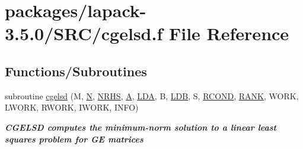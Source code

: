 \hypertarget{cgelsd_8f}{}\section{packages/lapack-\/3.5.0/\+S\+R\+C/cgelsd.f File Reference}
\label{cgelsd_8f}
\subsection*{Functions/\+Subroutines}
\begin{DoxyCompactItemize}
\item 
subroutine \hyperlink{group__complexGEsolve_gabe955d518aa1f5fec04eb13fb9ee56c2}{cgelsd} (M, \hyperlink{polmisc_8c_a0240ac851181b84ac374872dc5434ee4}{N}, \hyperlink{example__user_8c_aa0138da002ce2a90360df2f521eb3198}{N\+R\+H\+S}, \hyperlink{classA}{A}, \hyperlink{example__user_8c_ae946da542ce0db94dced19b2ecefd1aa}{L\+D\+A}, B, \hyperlink{example__user_8c_a50e90a7104df172b5a89a06c47fcca04}{L\+D\+B}, S, \hyperlink{superlu__enum__consts_8h_af00a42ecad444bbda75cde1b64bd7e72a9b5c151728d8512307565994c89919d5}{R\+C\+O\+N\+D}, \hyperlink{splinemodule_8c_a3a88bcc63386de30443dacede2e01847}{R\+A\+N\+K}, W\+O\+R\+K, L\+W\+O\+R\+K, R\+W\+O\+R\+K, I\+W\+O\+R\+K, I\+N\+F\+O)
\begin{DoxyCompactList}\small\item\em {\bfseries  C\+G\+E\+L\+S\+D computes the minimum-\/norm solution to a linear least squares problem for G\+E matrices} \end{DoxyCompactList}\end{DoxyCompactItemize}
